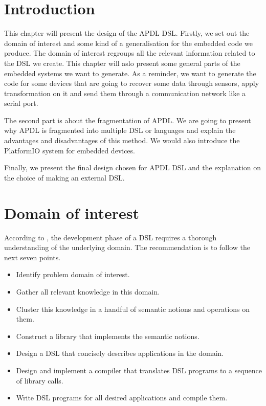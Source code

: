 
\section{Introduction}
\label{sec:design_intro}

This chapter will present the design of the \gls{APDL} \gls{DSL}. Firstly, we
set out the domain of interest and some kind of a generalisation for the embedded
code we produce. The domain of interest regroups all the relevant information
related to the \gls{DSL} we create. This chapter will aslo present some general parts
of the embedded systems we want to generate. As a reminder, we want to generate
the code for some devices that are going to recover some data through
sensors, apply transformation on it and send them through a communication network
like a serial port.

The second part is about the fragmentation of \gls{APDL}. We are going to
present why \gls{APDL} is fragmented into multiple \gls{DSL} or languages and explain
the advantages and disadvantages of this method. We would also introduce the
PlatformIO system for embedded devices.

Finally, we present the final design chosen for \gls{APDL} \gls{DSL} and the
explanation on the choice of making an external \gls{DSL}.

\section{Domain of interest}
\label{sec:design_domain_of_interest}

According to \cite{little_languages_little_maintenance}, the development phase
of a \gls{DSL} requires a thorough understanding of the underlying domain. The
recommendation is to follow the next seven points\cite{little_languages_little_maintenance}.

\begin{itemize}
\item Identify problem domain of interest.
\item Gather all relevant knowledge in this domain.
\item Cluster this knowledge in a handful of semantic notions and operations on them.
\item Construct a library that implements the semantic notions.
\item Design a DSL that concisely describes applications in the domain.
\item Design and implement a compiler that translates DSL programs to a sequence of library calls.
\item Write DSL programs for all desired applications and compile them.
\end{itemize}

